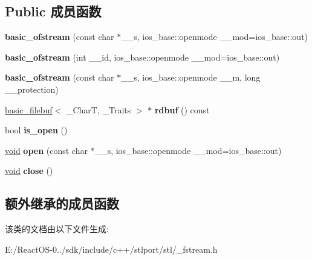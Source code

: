 \subsection*{Public 成员函数}
\begin{DoxyCompactItemize}
\item 
\mbox{\label{classbasic__ofstream_a76d70031d9c989bd8e909cc3e89fee3d}} 
{\bfseries basic\+\_\+ofstream} (const char $\ast$\+\_\+\+\_\+s, ios\+\_\+base\+::openmode \+\_\+\+\_\+mod=ios\+\_\+base\+::out)
\item 
\mbox{\label{classbasic__ofstream_ab3384960f8ed3c1f2e301dd058c5b1ea}} 
{\bfseries basic\+\_\+ofstream} (int \+\_\+\+\_\+id, ios\+\_\+base\+::openmode \+\_\+\+\_\+mod=ios\+\_\+base\+::out)
\item 
\mbox{\label{classbasic__ofstream_abdde073b582872ee3373941cda5270f6}} 
{\bfseries basic\+\_\+ofstream} (const char $\ast$\+\_\+\+\_\+s, ios\+\_\+base\+::openmode \+\_\+\+\_\+m, long \+\_\+\+\_\+protection)
\item 
\mbox{\label{classbasic__ofstream_a5056554476fa33c0264bd0203ff87d86}} 
\hyperlink{classbasic__filebuf}{basic\+\_\+filebuf}$<$ \+\_\+\+CharT, \+\_\+\+Traits $>$ $\ast$ {\bfseries rdbuf} () const
\item 
\mbox{\label{classbasic__ofstream_a02a53a282f9be8fa6b22d2dea3ec7575}} 
bool {\bfseries is\+\_\+open} ()
\item 
\mbox{\label{classbasic__ofstream_abb8a16771a574ccb6f368adeacc02f67}} 
\hyperlink{interfacevoid}{void} {\bfseries open} (const char $\ast$\+\_\+\+\_\+s, ios\+\_\+base\+::openmode \+\_\+\+\_\+mod=ios\+\_\+base\+::out)
\item 
\mbox{\label{classbasic__ofstream_a9819dc3f3b700ee26689598ef43ef967}} 
\hyperlink{interfacevoid}{void} {\bfseries close} ()
\end{DoxyCompactItemize}
\subsection*{额外继承的成员函数}


该类的文档由以下文件生成\+:\begin{DoxyCompactItemize}
\item 
E\+:/\+React\+O\+S-\/0../sdk/include/c++/stlport/stl/\+\_\+fstream.\+h\end{DoxyCompactItemize}
